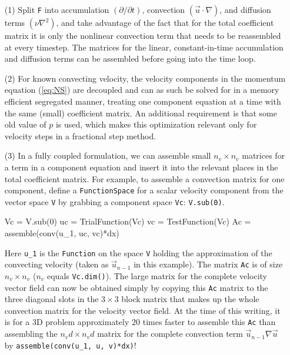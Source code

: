 \begin{itemize}
 \item[(1)] Split {\fontsize{12pt}{12pt}\texttt{F}} into accumulation $(\partial /\partial t)$,
convection $(\vec{u}\cdot\nabla)$, and diffusion terms
$(\nu\nabla^2)$, and take advantage of the fact that for the total
coefficient matrix it is only the nonlinear convection term that needs
to be reassembled at every timestep. The matrices for the linear,
constant-in-time accumulation and diffusion terms can be assembled
before going into the time loop.

\item[(2)] For known convecting velocity, 
 the velocity components in the momentum equation (\ref{eq:NS})
 are decoupled and can as such be solved for in a
 memory efficient segregated manner, treating one component equation
 at a time with the same (small) coefficient matrix. An additional requirement is that some old value of $p$ is used,
 which makes this optimization relevant only for velocity steps in
 a fractional step method.

\item[(3)]
 In a fully coupled formulation,
 we can assemble small $n_v\times n_v$ matrices for a term in a
 component equation and insert it into the relevant places in
 the total coefficient matrix.
 For example, to assemble a convection matrix for one component, define
 a {\fontsize{12pt}{12pt}\texttt{FunctionSpace}} for a scalar velocity component from the 
 vector space {\fontsize{12pt}{12pt}\texttt{V}} by grabbing a component space {\fontsize{12pt}{12pt}\texttt{Vc}}: {\fontsize{12pt}{12pt}\texttt{V.sub(0)}}.
\begin{fenicscode}{0.9}
Vc = V.sub(0)
uc = TrialFunction(Vc)
vc = TestFunction(Vc)
Ac = assemble(conv(u_1, uc, vc)*dx)
\end{fenicscode}
Here {\fontsize{12pt}{12pt}\verb!u_1!} is the {\fontsize{12pt}{12pt}\texttt{Function}} on the space {\fontsize{12pt}{12pt}\texttt{V}}
holding the approximation of the
convecting velocity (taken as $\vec{u}_{n-1}$ in this example). 
The matrix {\fontsize{12pt}{12pt}\texttt{Ac}} is of size $n_v\times n_v$ ($n_v$ equals
{\fontsize{12pt}{12pt}\texttt{Vc.dim()}}).
The large matrix for the complete velocity vector field can now be
obtained simply by copying this {\fontsize{12pt}{12pt}\texttt{Ac}} matrix to the three diagonal
slots in the $3\times 3$ block matrix that makes up the whole
convection matrix for the velocity vector field.  At the time of this
writing, it is for a 3D problem approximately 20 times faster to
assemble this {\fontsize{12pt}{12pt}\texttt{Ac}} than assembling the $n_vd\times n_vd$ matrix
for the complete convection term $\vec{u}_{n-1}\nabla
\vec{u}$ by {\fontsize{12pt}{12pt}\verb!assemble(conv(u_1, u, v)*dx)!}!


\end{itemize}
